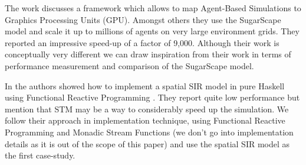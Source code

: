 The work \cite{lysenko_framework_2008} discusses a framework which allows to map Agent-Based Simulations to Graphics Processing Units (GPU). Amongst others they use the SugarScape model \cite{epstein_growing_1996} and scale it up to millions of agents on very large environment grids. They reported an impressive speed-up of a factor of 9,000. Although their work is conceptually very different we can draw inspiration from their work in terms of performance measurement and comparison of the SugarScape model.

In \cite{thaler_pure_2019} the authors showed how to implement a spatial SIR model in pure Haskell using Functional Reactive Programming \cite{hudak_arrows_2003}. They report quite low performance but mention that STM may be a way to considerably speed up the simulation. We follow their approach in implementation technique, using Functional Reactive Programming and Monadic Stream Functions \cite{perez_functional_2016} (we don't go into implementation details as it is out of the scope of this paper) and use the spatial SIR model as the first case-study.


